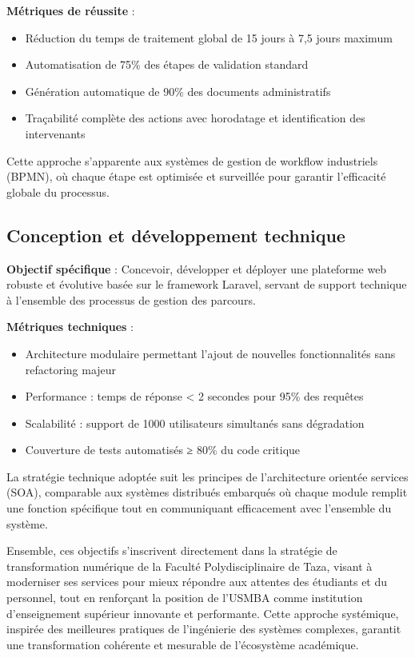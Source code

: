 \documentclass[12pt,a4paper]{report}
\begin{document}
\textbf{Métriques de réussite} :
\begin{itemize}
    \item Réduction du temps de traitement global de 15 jours à 7,5 jours maximum
    \item Automatisation de 75\% des étapes de validation standard
    \item Génération automatique de 90\% des documents administratifs
    \item Traçabilité complète des actions avec horodatage et identification des intervenants
\end{itemize}

Cette approche s'apparente aux systèmes de gestion de workflow industriels (BPMN), où chaque étape est optimisée et surveillée pour garantir l'efficacité globale du processus.

\subsection{Conception et développement technique}

\textbf{Objectif spécifique} : Concevoir, développer et déployer une plateforme web robuste et évolutive basée sur le framework Laravel, servant de support technique à l'ensemble des processus de gestion des parcours.

\textbf{Métriques techniques} :
\begin{itemize}
    \item Architecture modulaire permettant l'ajout de nouvelles fonctionnalités sans refactoring majeur
    \item Performance : temps de réponse < 2 secondes pour 95\% des requêtes
    \item Scalabilité : support de 1000 utilisateurs simultanés sans dégradation
    \item Couverture de tests automatisés ≥ 80\% du code critique
\end{itemize}

La stratégie technique adoptée suit les principes de l'architecture orientée services (SOA), comparable aux systèmes distribués embarqués où chaque module remplit une fonction spécifique tout en communiquant efficacement avec l'ensemble du système.

\vspace{1cm}

Ensemble, ces objectifs s'inscrivent directement dans la stratégie de transformation numérique de la Faculté Polydisciplinaire de Taza, visant à moderniser ses services pour mieux répondre aux attentes des étudiants et du personnel, tout en renforçant la position de l'USMBA comme institution d'enseignement supérieur innovante et performante. Cette approche systémique, inspirée des meilleures pratiques de l'ingénierie des systèmes complexes, garantit une transformation cohérente et mesurable de l'écosystème académique.
\end{document}
